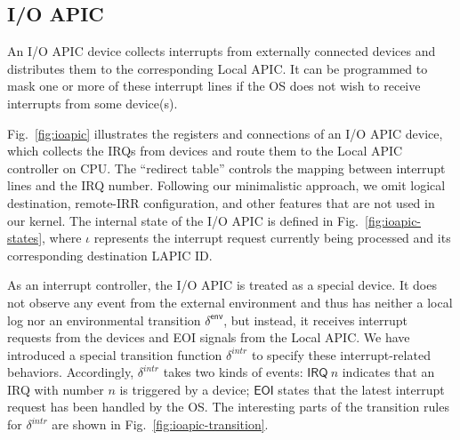 \subsection{I/O APIC}

An I/O APIC device collects interrupts from externally connected devices and
distributes them to the corresponding Local APIC. It can be programmed to mask
one or more of these interrupt lines if the OS does not wish to receive
interrupts from some device(s).

Fig.~\ref{fig:ioapic} illustrates the registers and connections of an I/O APIC
device, which collects the IRQs from devices and route them to the Local APIC
controller on CPU. The ``redirect table'' controls the mapping between interrupt
lines and the IRQ number. Following our minimalistic approach, we omit logical
destination, remote-IRR configuration, and other features that are not used in
our kernel. The internal state of the I/O APIC is defined in
Fig.~\ref{fig:ioapic-states}, where $\iota$ represents the interrupt request
currently being processed and its corresponding destination LAPIC ID.

As an interrupt controller, the I/O APIC is treated as a special device. It does
not observe any event from the external environment and thus has neither a
local log nor an environmental transition $\delta^{\textsf{env}}$, but instead,
it receives interrupt requests from the devices and EOI signals from the Local
APIC. We have introduced a special transition function $\delta^{intr}$ to
specify these interrupt-related behaviors.  Accordingly, $\delta^{intr}$ takes
two kinds of events: $\textsf{IRQ} ~ n$ indicates that an IRQ with number $n$ is
triggered by a device; $\textsf{EOI}$ states that the latest interrupt
request has been handled by the OS.  The interesting parts of the transition
rules for $\delta^{intr}$ are shown in Fig.~\ref{fig:ioapic-transition}.


